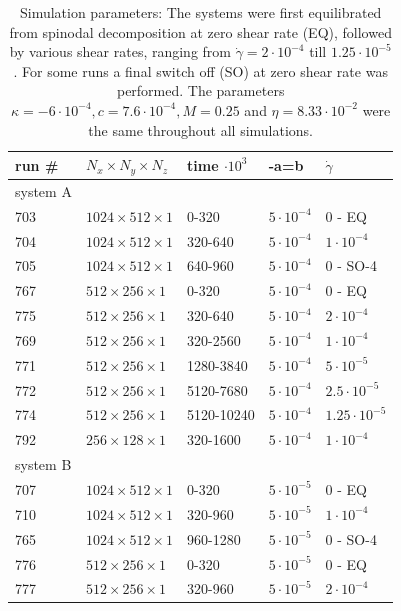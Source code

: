 \documentclass[8.5pt,twoside,twocolumn]{article}
\begin{document}
\begin{table}[htp]
\small
\caption{Simulation parameters: The systems were first equilibrated from spinodal decomposition at zero shear rate (EQ), followed by various shear rates, ranging from $\dot{\gamma}=2\cdot10^{-4}$ till $1.25\cdot10^{-5}$. For some runs a final switch off (SO) at zero shear rate was performed. The parameters $\kappa=-6\cdot10^{-4}, c=7.6\cdot10^{-4}, M=0.25$ and $\eta=8.33\cdot10^{-2}$ were the same throughout all simulations.}
  \label{tab1}
  \begin{tabular*}{0.495\textwidth}{lllll}
\hline
run \# & $N_x\times N_y\times N_z$ & time $\cdot 10^3$ & -a=b &  $\dot\gamma$\\
\hline
system A & & & &\\
\hline 
703 & $1024\times512\times1$ & 0-320 & $5\cdot10^{-4}$ & 0 - EQ  \\
704 & $1024\times512\times1$ & 320-640& $5\cdot10^{-4}$ & $1\cdot10^{-4}$\\
705 & $1024\times512\times1$ & 640-960& $5\cdot10^{-4}$ & 0 - SO-4 \\
\hline
767 & $512\times256\times1$ & 0-320 & $5\cdot10^{-4}$  & 0 - EQ\\
775 & $512\times256\times1$ & 320-640& $5\cdot10^{-4}$ & $2\cdot 10^{-4}$ \\
769 & $512\times256\times1$ & 320-2560& $5\cdot10^{-4}$ & $1\cdot 10^{-4}$ \\
771 & $512\times256\times1$ & 1280-3840& $5\cdot10^{-4}$ & $ 5\cdot10^{-5}$ \\
772 & $512\times256\times1$ & 5120-7680& $5\cdot10^{-4}$ & $ 2.5\cdot10^{-5}$ \\
774 & $512\times256\times1$ & 5120-10240& $5\cdot10^{-4}$ & $1.25\cdot10^{-5}$ \\
\hline
792 & $256\times128\times1$ & 320-1600& $5\cdot10^{-4}$ & $1\cdot10^{-4}$ \\
system B & & & &\\
\hline
707 & $1024\times512\times1$ & 0-320 & $5\cdot10^{-5}$ & 0 - EQ \\
710 & $1024\times512\times1$ & 320-960& $5\cdot10^{-5}$ & $1\cdot10^{-4}$ \\
765 & $1024\times512\times1$ & 960-1280& $5\cdot10^{-5}$ & 0 - SO-4 \\
\hline
776 & $512\times256\times1$ & 0-320 & $5\cdot10^{-5}$ & 0 - EQ\\
777 & $512\times256\times1$ & 320-960& $5\cdot10^{-5}$ & $2\cdot 10^{-4}$ \\

\end{tabular*}
\end{table}
\end{document}

